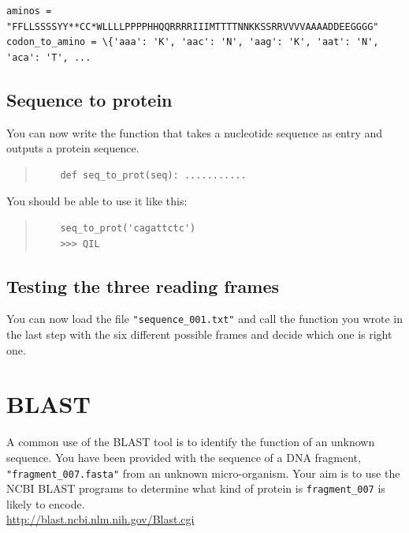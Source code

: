 \documentclass[a4paper,11pt]{article}
\begin{document}
\begin{verbatim}
aminos = "FFLLSSSSYY**CC*WLLLLPPPPHHQQRRRRIIIMTTTTNNKKSSRRVVVVAAAADDEEGGGG"
codon_to_amino = \{'aaa': 'K', 'aac': 'N', 'aag': 'K', 'aat': 'N', 'aca': 'T', ...
\end{verbatim}

\subsection{Sequence to protein}
You can now write the function that takes a nucleotide sequence as entry and outputs a protein sequence.

\begin{quote}
\begin{verbatim}
	def seq_to_prot(seq): ...........
\end{verbatim}
\end{quote}

You should be able to use it like this:
\begin{quote}
\begin{verbatim}
	seq_to_prot('cagattctc')
	>>> QIL
\end{verbatim}
\end{quote}

\subsection{Testing the three reading frames}
You can now load the file \texttt{"sequence\_001.txt"} and call the function you wrote in the last step with the six different possible frames and decide which one is right one.


\section{BLAST}
A common use of the BLAST tool is to identify the function of an unknown sequence. You have been provided with the sequence of a DNA fragment, \texttt{"fragment\_007.fasta"} from an unknown micro-organism. Your aim is to use the NCBI BLAST programs to determine what kind of protein is \texttt{fragment\_007} is likely to encode.\\

\url{http://blast.ncbi.nlm.nih.gov/Blast.cgi}
\end{document}
